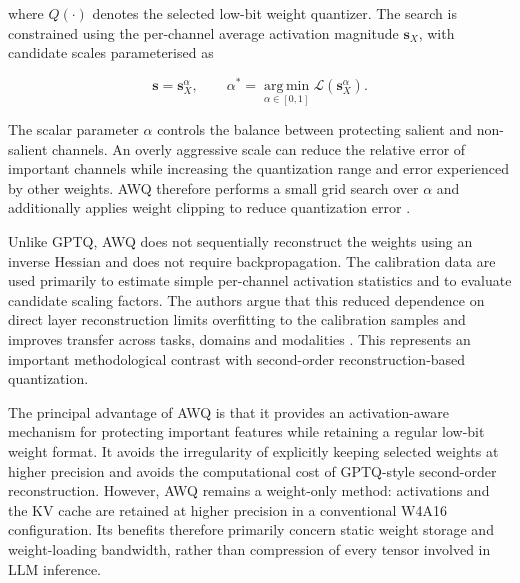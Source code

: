where \(Q(\cdot)\) denotes the selected low-bit weight quantizer. The
search is constrained using the per-channel average activation
magnitude \(\mathbf{s}_{X}\), with candidate scales parameterised as

\begin{equation}
\mathbf{s}
=
\mathbf{s}_{X}^{\alpha},
\qquad
\alpha^{*}
=
\underset{\alpha\in[0,1]}{\operatorname{arg\,min}}
\mathcal{L}\left(\mathbf{s}_{X}^{\alpha}\right).
\label{eq:awq-scale-search}
\end{equation}

The scalar parameter \(\alpha\) controls the balance between protecting
salient and non-salient channels. An overly aggressive scale can reduce
the relative error of important channels while increasing the
quantization range and error experienced by other weights. AWQ
therefore performs a small grid search over \(\alpha\) and additionally
applies weight clipping to reduce quantization error
\cite{lin2026awqactivationawareweightquantization}.

Unlike GPTQ, AWQ does not sequentially reconstruct the weights using an
inverse Hessian and does not require backpropagation. The calibration
data are used primarily to estimate simple per-channel activation
statistics and to evaluate candidate scaling factors. The authors argue
that this reduced dependence on direct layer reconstruction limits
overfitting to the calibration samples and improves transfer across
tasks, domains and modalities \cite{lin2026awqactivationawareweightquantization}. This represents an
important methodological contrast with second-order
reconstruction-based quantization.

The principal advantage of AWQ is that it provides an activation-aware
mechanism for protecting important features while retaining a regular
low-bit weight format. It avoids the irregularity of explicitly keeping
selected weights at higher precision and avoids the computational cost
of GPTQ-style second-order reconstruction. However, AWQ remains a
weight-only method: activations and the KV cache are retained at higher
precision in a conventional W4A16 configuration. Its benefits therefore
primarily concern static weight storage and weight-loading bandwidth,
rather than compression of every tensor involved in LLM inference.

